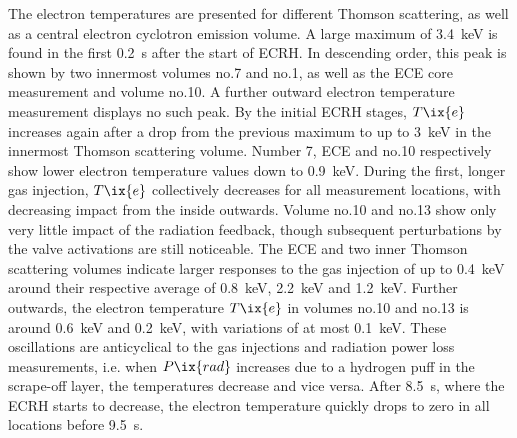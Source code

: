            The electron temperatures are presented for different Thomson scattering, as well as a central electron cyclotron emission volume. A large maximum of \SI{3.4}{\kilo\electronvolt} is found in the first \SI{0.2}{\second} after the start of ECRH. In descending order, this peak is shown by two innermost volumes no.7 and no.1, as well as the ECE core measurement and volume no.10. A further outward electron temperature measurement displays no such peak. By the initial ECRH stages, $T\ix{e}$ increases again after a drop from the previous maximum to up to \SI{3}{\kilo\electronvolt} in the innermost Thomson scattering volume. Number 7, ECE and no.10 respectively show lower electron temperature values down to \SI{0.9}{\kilo\electronvolt}. During the first, longer gas injection, $T\ix{e}$ collectively decreases for all measurement locations, with decreasing impact from the inside outwards. Volume no.10 and no.13 show only very little impact of the radiation feedback, though subsequent perturbations by the valve activations are still noticeable. The ECE and two inner Thomson scattering volumes indicate larger responses to the gas injection of up to \SI{0.4}{\kilo\electronvolt} around their respective average of \SI{0.8}{\kilo\electronvolt}, \SI{2.2}{\kilo\electronvolt} and \SI{1.2}{\kilo\electronvolt}. Further outwards, the electron temperature $T\ix{e}$ in volumes no.10 and no.13 is around \SI{0.6}{\kilo\electronvolt} and \SI{0.2}{\kilo\electronvolt}, with variations of at most \SI{0.1}{\kilo\electronvolt}. These oscillations are anticyclical to the gas injections and radiation power loss measurements, i.e. when $P\ix{rad}$ increases due to a hydrogen puff in the scrape-off layer, the temperatures decrease and vice versa. After \SI{8.5}{\second}, where the ECRH starts to decrease, the electron temperature quickly drops to zero in all locations before \SI{9.5}{\second}.\\%

